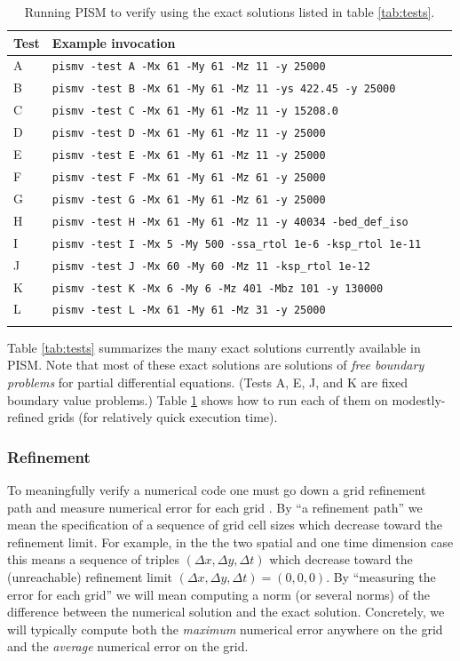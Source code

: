 \documentclass[11pt,final]{amsart}
\begin{document}
\begin{table}[ht]
\caption{Running PISM to verify using the exact solutions listed in table \ref{tab:tests}.}\label{tab:tests_exec}
\small
\begin{tabular}{@{}llll}\hline
\textbf{Test} & \textbf{Example invocation}  \\ \hline
A & \verb|pismv -test A -Mx 61 -My 61 -Mz 11 -y 25000| \\
B & \verb|pismv -test B -Mx 61 -My 61 -Mz 11 -ys 422.45 -y 25000|  \\
C & \verb|pismv -test C -Mx 61 -My 61 -Mz 11 -y 15208.0|  \\
D & \verb|pismv -test D -Mx 61 -My 61 -Mz 11 -y 25000|  \\
E & \verb|pismv -test E -Mx 61 -My 61 -Mz 11 -y 25000|  \\
F & \verb|pismv -test F -Mx 61 -My 61 -Mz 61 -y 25000|  \\
G & \verb|pismv -test G -Mx 61 -My 61 -Mz 61 -y 25000|  \\
H & \verb|pismv -test H -Mx 61 -My 61 -Mz 11 -y 40034 -bed_def_iso| \\
I & \verb|pismv -test I -Mx 5 -My 500 -ssa_rtol 1e-6 -ksp_rtol 1e-11| \\
J & \verb|pismv -test J -Mx 60 -My 60 -Mz 11 -ksp_rtol 1e-12| \\
K & \verb|pismv -test K -Mx 6 -My 6 -Mz 401 -Mbz 101 -y 130000| \\
L & \verb|pismv -test L -Mx 61 -My 61 -Mz 31 -y 25000| \\
\hline
\normalsize
\end{tabular}
\end{table}

Table \ref{tab:tests} summarizes the many exact solutions currently available in PISM.  Note that most of these exact solutions are solutions of \emph{free boundary problems} for partial differential equations.  (Tests A, E, J, and K are fixed boundary value problems.)  Table \ref{tab:tests_exec} shows how to run each of them on modestly-refined grids (for relatively quick execution time).

\subsubsection*{Refinement}  To meaningfully verify a numerical code one must go down a grid refinement path and measure numerical error for each grid \cite{Roache}.  By ``a refinement path'' we mean the specification of a sequence of grid cell sizes which decrease toward the refinement limit.  For example, in the the two spatial and one time dimension case this means a sequence of triples $(\Delta x,\Delta y,\Delta t)$ which decrease toward the (unreachable) refinement limit $(\Delta x,\Delta y,\Delta t) = (0,0,0)$.  By ``measuring the error for each grid'' we will mean computing a norm (or several norms) of the difference between the numerical solution and the exact solution.   Concretely, we will typically compute both the \emph{maximum} numerical error anywhere on the grid and the \emph{average} numerical error on the grid.
\end{document}

